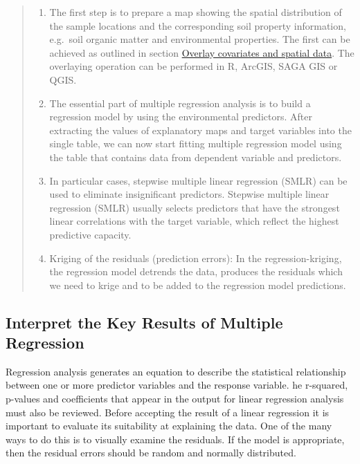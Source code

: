 \documentclass[10pt,b5paper,]{book}
\providecommand{\tightlist}{%
  \setlength{\itemsep}{0pt}\setlength{\parskip}{0pt}}
\theoremstyle{definition}
\theoremstyle{definition}
\theoremstyle{definition}
\theoremstyle{remark}
\begin{document}
\begin{quote}
\begin{enumerate}
\def\labelenumi{\arabic{enumi}.}
\tightlist
\item
  The first step is to prepare a map showing the spatial distribution of
  the sample locations and the corresponding soil property information,
  e.g.~soil organic matter and environmental properties. The first can
  be achieved as outlined in section
  \protect\hyperlink{overlay-covariates-and-spatial-data}{Overlay
  covariates and spatial data}. The overlaying operation can be
  performed in R, ArcGIS, SAGA GIS or QGIS.
\item
  The essential part of multiple regression analysis is to build a
  regression model by using the environmental predictors. After
  extracting the values of explanatory maps and target variables into
  the single table, we can now start fitting multiple regression model
  using the table that contains data from dependent variable and
  predictors.
\item
  In particular cases, stepwise multiple linear regression (SMLR) can be
  used to eliminate insignificant predictors. Stepwise multiple linear
  regression (SMLR) usually selects predictors that have the strongest
  linear correlations with the target variable, which reflect the
  highest predictive capacity.
\item
  Kriging of the residuals (prediction errors): In the
  regression-kriging, the regression model detrends the data, produces
  the residuals which we need to krige and to be added to the regression
  model predictions.
\end{enumerate}
\end{quote}

\hypertarget{interpret-the-key-results-of-multiple-regression}{%
\subsection{Interpret the Key Results of Multiple
Regression}\label{interpret-the-key-results-of-multiple-regression}}

Regression analysis generates an equation to describe the statistical
relationship between one or more predictor variables and the response
variable. he r-squared, p-values and coefficients that appear in the
output for linear regression analysis must also be reviewed. Before
accepting the result of a linear regression it is important to evaluate
its suitability at explaining the data. One of the many ways to do this
is to visually examine the residuals. If the model is appropriate, then
the residual errors should be random and normally distributed.
\end{document}
